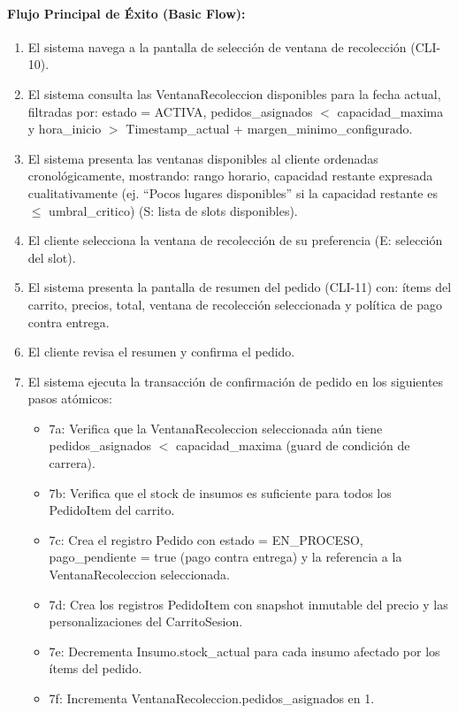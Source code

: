 \paragraph{Flujo Principal de Éxito (Basic Flow):}
\begin{enumerate}
    \item[I.] El sistema navega a la pantalla de selección de ventana de recolección (CLI-10).
    \item[II.] El sistema consulta las VentanaRecoleccion disponibles para la fecha actual, filtradas por: estado = ACTIVA, pedidos\_asignados $<$ capacidad\_maxima y hora\_inicio $>$ Timestamp\_actual + margen\_minimo\_configurado.
    \item[III.] El sistema presenta las ventanas disponibles al cliente ordenadas cronológicamente, mostrando: rango horario, capacidad restante expresada cualitativamente (ej. ``Pocos lugares disponibles'' si la capacidad restante es $\le$ umbral\_critico) (S: lista de slots disponibles).
    \item[IV.] El cliente selecciona la ventana de recolección de su preferencia (E: selección del slot).
    \item[V.] El sistema presenta la pantalla de resumen del pedido (CLI-11) con: ítems del carrito, precios, total, ventana de recolección seleccionada y política de pago contra entrega.
    \item[VI.] El cliente revisa el resumen y confirma el pedido.
    \item[VII.] El sistema ejecuta la transacción de confirmación de pedido en los siguientes pasos atómicos:
    \begin{itemize}
        \item 7a: Verifica que la VentanaRecoleccion seleccionada aún tiene pedidos\_asignados $<$ capacidad\_maxima (guard de condición de carrera).
        \item 7b: Verifica que el stock de insumos es suficiente para todos los PedidoItem del carrito.
        \item 7c: Crea el registro Pedido con estado = EN\_PROCESO, pago\_pendiente = true (pago contra entrega) y la referencia a la VentanaRecoleccion seleccionada.
        \item 7d: Crea los registros PedidoItem con snapshot inmutable del precio y las personalizaciones del CarritoSesion.
        \item 7e: Decrementa Insumo.stock\_actual para cada insumo afectado por los ítems del pedido.
        \item 7f: Incrementa VentanaRecoleccion.pedidos\_asignados en 1.

\end{itemize}
\end{enumerate}
